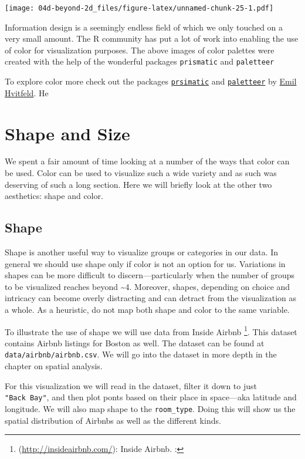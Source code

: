 \documentclass[
]{book}
\begin{document}
\texttt{[image: 04d-beyond-2d\_files/figure-latex/unnamed-chunk-25-1.pdf]}

Information design is a seemingly endless field of which we only touched on a very small amount. The R community has put a lot of work into enabling the use of color for visualization purposes. The above images of color palettes were created with the help of the wonderful packages \texttt{prismatic} and \texttt{paletteer}

To explore color more check out the packages \href{https://github.com/EmilHvitfeldt/prismatic}{\texttt{prsimatic}} and \href{https://github.com/EmilHvitfeldt/paletteer}{\texttt{paletteer}} by \href{https://www.hvitfeldt.me/blog/}{Emil Hvitfeld}. He

\hypertarget{shape-and-size}{%
\section{Shape and Size}\label{shape-and-size}}

We spent a fair amount of time looking at a number of the ways that color can be used. Color can be used to visualize such a wide variety and as such was deserving of such a long section. Here we will briefly look at the other two aesthetics: shape and color.

\hypertarget{shape}{%
\subsection{Shape}\label{shape}}

Shape is another useful way to visualize groups or categories in our data. In general we should use shape only if color is not an option for us. Variations in shapes can be more difficult to discern---particularly when the number of groups to be visualized reaches beyond \textasciitilde4. Moreover, shapes, depending on choice and intricacy can become overly distracting and can detract from the visualization as a whole. As a heuristic, do not map both shape and color to the same variable.

To illustrate the use of shape we will use data from Inside Airbnb \footnote{(\url{http://insideairbnb.com/}): Inside Airbnb.
  \footnotemark{}:}. This dataset contains Airbnb listings for Boston as well. The dataset can be found at \texttt{data/airbnb/airbnb.csv}. We will go into the dataset in more depth in the chapter on spatial analysis.

For this visualization we will read in the dataset, filter it down to just \texttt{"Back\ Bay"}, and then plot ponts based on their place in space---aka latitude and longitude. We will also map shape to the \texttt{room\_type}. Doing this will show us the spatial distribution of Airbnbs as well as the different kinds.
\end{document}
